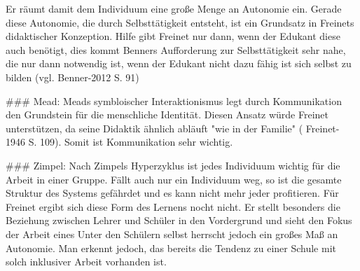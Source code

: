 Er räumt damit dem Individuum eine große Menge an Autonomie ein.
Gerade diese Autonomie, die durch Selbsttätigkeit entsteht, ist ein Grundsatz in Freinets didaktischer Konzeption.
Hilfe gibt Freinet nur dann, wenn der Edukant diese auch benötigt, dies kommt Benners Aufforderung zur Selbsttätigkeit sehr nahe, die nur dann notwendig ist, wenn der Edukant nicht dazu fähig ist sich selbst zu bilden (vgl. Benner-2012 S. 91)

### Mead:
Meads symbloischer Interaktionismus legt durch Kommunikation den Grundstein für die menschliche Identität.
Diesen Ansatz würde Freinet unterstützen, da seine Didaktik ähnlich abläuft "wie in der Familie" ( Freinet-1946 S. 109).
Somit ist Kommunikation sehr wichtig.

### Zimpel:
Nach Zimpels Hyperzyklus ist jedes Individuum wichtig für die Arbeit in einer Gruppe.
Fällt auch nur ein Individuum weg, so ist die gesamte Struktur des Systems gefährdet und es kann nicht mehr jeder profitieren.
Für Freinet ergibt sich diese Form des Lernens nocht nicht.
Er stellt besonders die Beziehung zwischen Lehrer und Schüler in den Vordergrund und sieht den Fokus der Arbeit eines
Unter den Schülern selbst herrscht jedoch ein großes Maß an Autonomie.
Man erkennt jedoch, das bereits die Tendenz zu einer Schule mit solch inklusiver Arbeit vorhanden ist.

